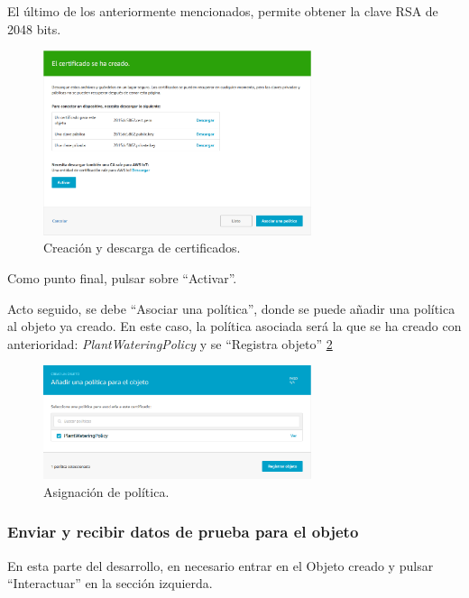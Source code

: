 \documentclass[english,runningheads,a4paper]{llncs}[2018/03/10]
\begin{document}
El último de los anteriormente mencionados, permite obtener la clave RSA de 2048
bits.

\begin{figure}[h!]
 \centering
 \includegraphics[width=0.7\textwidth]{./IoT/AWS/2-3_certificate.png}
 \caption{Creación y descarga de certificados.}
 \label{certificate}
\end{figure}

Como punto final, pulsar sobre ``Activar''.

Acto seguido, se debe ``Asociar una política'', donde se puede añadir una
política al objeto ya creado.  En este caso, la política asociada será la que se
ha creado con anterioridad: \textit{PlantWateringPolicy} y se ``Registra
objeto'' \hyperref[assignmentpolicy]{\ref{assignmentpolicy}}

\begin{figure}[h!]
 \centering
 \includegraphics[width=0.7\textwidth]{./IoT/AWS/2-4_policy.png}
 \caption{Asignación de política.}
 \label{assignmentpolicy}
\end{figure}

\subsubsection{Enviar y recibir datos de prueba para el objeto}

En esta parte del desarrollo, en necesario entrar en el Objeto creado y pulsar
``Interactuar'' en la sección izquierda.
\end{document}
